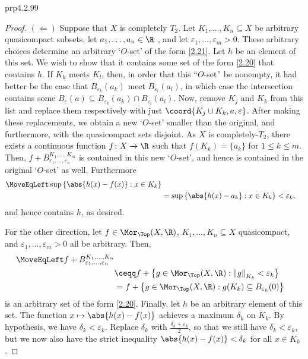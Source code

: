 \begin{prp}{}{prp4.2.99}
\begin{proof}
		\blni
		$(\Leftarrow )$ Suppose that $X$ is completely $T_2$.  Let $K_1,\ldots ,K_n\subseteq X$ be arbitrary quasicompact subsets, let $a_1,\ldots ,a_n\in \R$ , and let $\varepsilon _1,\ldots ,\varepsilon _m>0$.  These arbitrary choices determine an arbitrary `$O$-set' of the form \eqref{2.21}.  Let $h$ be an element of this set.  We wish to show that it contains some set of the form \eqref{2.20} that contains $h$.  If $K_k$ meets $K_l$, then, in order that this ``$O$-set'' be nonempty, it had better be the case that $B_{\varepsilon _k}(a_k)$ meet $B_{\varepsilon _l}(a_l)$, in which case the intersection contains some $B_{\varepsilon}(a)\subseteq B_{\varepsilon _k}(a_k)\cap B_{\varepsilon _l}(a_l)$.  Now, remove $K_j$ and $K_k$ from this list and replace them respectively with just $\coord{K_j\cup K_k,a,\varepsilon}$.   After making these replacements, we obtain a new `$O$-set' smaller than the original, and furthermore, with the quasicompact sets disjoint.  As $X$ is completely-$T_2$, there exists a continuous function $f\colon X\rightarrow \R$ such that $f(K_k)=\{ a_k\}$ for $1\leq k\leq m$.  Then, $f+B_{\varepsilon _1,\ldots ,\varepsilon _n}^{K_1,\ldots ,K_m}$ is contained in this new `$O$-set', and hence is contained in the original `$O$-set' as well.  Furthermore
		\begin{equation*}
		\begin{split}
		\MoveEqLeft
		\sup \left\{ \abs{h(x)-f(x)}:x\in K_k\right\} \\
		& =\sup \left\{ \abs{h(x)-a_k}:x\in K_k\right\} <\varepsilon _k,
		\end{split}
		\end{equation*}
		and hence contains $h$, as desired. 
		
		For the other direction, let $f\in \Mor _{\Top}(X,\R )$, $K_1,\ldots ,K_n\subseteq X$ quasicompact, and $\varepsilon _1,\ldots ,\varepsilon _m>0$ all be arbitrary.  Then,
		\begin{equation}\label{eqn4.2.105}
			\begin{split}
				\MoveEqLeft
				f+B_{\varepsilon _1,\ldots ,\varepsilon _n}^{K_1,\ldots ,K_n} \\
				& \ceqq f+\left\{ g\in \Mor _{\Top}(X,\R ):\left\| g\right\| _{K_k}<\varepsilon _k\right\} \\
				& =f+\left\{ g\in \Mor _{\Top}(X,\R ):g(K_k)\subseteq B_{\varepsilon _k}(0)\right\} 
			\end{split}
		\end{equation}
		is an arbitrary set of the form \eqref{2.20}.  Finally, let $h$ be an arbitrary element of this set.   The function $x\mapsto \abs{h(x)-f(x)}$ achieves a maximum $\delta _k$ on $K_k$.  By hypothesis, we have $\delta _k<\varepsilon _k$.  Replace $\delta _k$ with $\frac{\delta _k+\varepsilon _k}{2}$, so that we still have $\delta _k<\varepsilon _k$, but we now also have the strict inequality $\abs{h(x)-f(x)}<\delta _k$ for all $x\in K_k$.
		

\end{proof}
\end{prp}
